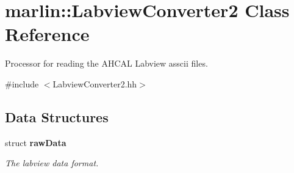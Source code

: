 \section{marlin::LabviewConverter2 Class Reference}
\label{classmarlin_1_1LabviewConverter2}


Processor for reading the AHCAL Labview asscii files.  


{\ttfamily \#include $<$LabviewConverter2.hh$>$}\subsection*{Data Structures}
\begin{DoxyCompactItemize}
\item 
struct {\bf rawData}
\begin{DoxyCompactList}\small\item\em The labview data format. \item\end{DoxyCompactList}\end{DoxyCompactItemize}
